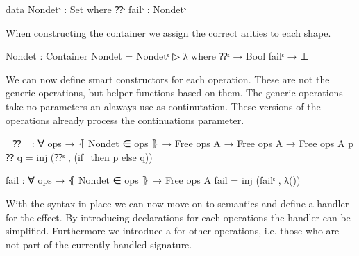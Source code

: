 \begin{code}
data Nondetˢ : Set where ⁇ˢ failˢ : Nondetˢ
\end{code}
When constructing the container we assign the correct arities to each shape.

\begin{code}
Nondet : Container
Nondet = Nondetˢ ▷ λ where
  ⁇ˢ     → Bool
  failˢ  → ⊥
\end{code}
We can now define smart constructors for each operation.
These are not the generic operations, but helper functions based on them.
The generic operations take no parameters an alaways use
 as continutation.
These versions of the operations already process the continuations parameter.

\begin{code}
_⁇_ : ∀ {ops} → ⦃ Nondet ∈ ops ⦄ → Free ops A → Free ops A → Free ops A
p ⁇ q = inj (⁇ˢ , (if_then p else q))

fail : ∀ {ops} → ⦃ Nondet ∈ ops ⦄ → Free ops A
fail = inj (failˢ , λ())
\end{code}
With the syntax in place we can now move on to semantics and define a handler
for the effect.
By introducing  declarations for each operations the
handler can be simplified.
Furthermore we introduce a  for other operations, i.e.
those who are not part of the currently handled signature.

